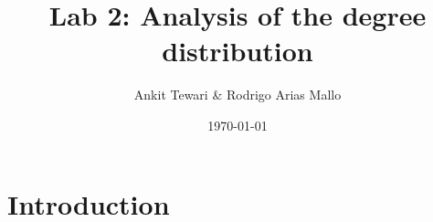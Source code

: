 \documentclass[a4paper]{article}
\title{Lab 2: Analysis of the degree distribution}
\author{Ankit Tewari \& Rodrigo Arias Mallo}
\date{\today}
\begin{document}
\maketitle

\section{Introduction}




\end{document}

